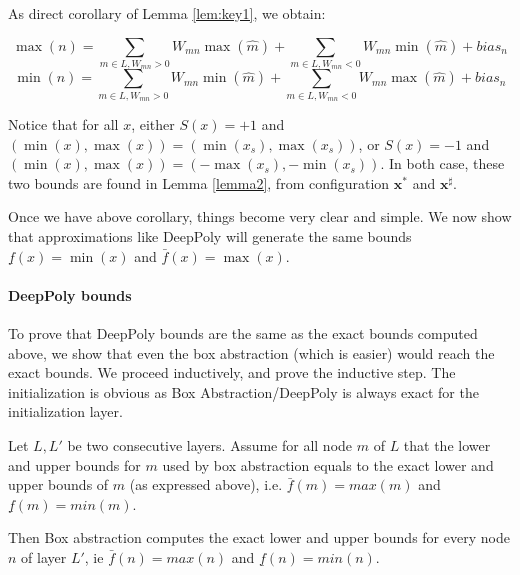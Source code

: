 		As direct corollary of Lemma \ref{lem:key1}, we obtain:
		
		\begin{corollary}
			\label{cor1}
			$$\max(n)=\sum_{m \in L, W_{m n}>0}W_{m n} \max(\hat{m}) + \sum_{m \in L, W_{m n}<0}W_{mn} \min(\hat{m}) + bias_n$$
			$$\min(n)=\sum_{m \in L, W_{m n}>0}W_{m n} \min(\hat{m}) + \sum_{m \in L, W_{m n}<0}W_{mn} \max(\hat{m}) + bias_n$$
		\end{corollary}
		
		
		Notice that for all $x$, either $S(x)=+1$ and 
		$(\min(x),\max(x))=(\min(x_s),\max(x_s))$, 
		or $S(x)=-1$ and $(\min(x),\max(x))=(-\max(x_s),-\min(x_s))$.
		In both case, these two bounds are found in Lemma \ref{lemma2},
		from configuration $\boldsymbol{x}^*$ and $\boldsymbol{x}^\sharp$.
		
		
		
		Once we have above corollary, things become very clear and simple. We now show that approximations like DeepPoly will generate the same bounds 
		$\underline{f}(x)=\min(x)$ and $\bar{f}(x)=\max(x)$.
		
		\paragraph{DeepPoly bounds}
		
		To prove that DeepPoly bounds are the same as the exact bounds computed above, 
		we show that even the box abstraction (which is easier) would reach the exact bounds.
		We proceed inductively, and prove the inductive step.
		The initialization is obvious as Box Abstraction/DeepPoly is always exact for the initialization layer.
		
		\begin{lemma}
			Let $L,L'$ be two consecutive layers.
			Assume for all node $m$ of $L$ that the lower and upper bounds for $m$ used by box abstraction equals to the exact lower and upper bounds of $m$ (as expressed above), i.e.
			$\bar{f}(m)=max(m)$ and $\underline{f}(m)=min(m)$.
			
			Then Box abstraction computes the exact lower and upper bounds for every node $n$ of layer $L'$, ie $\bar{f}(n)=max(n)$ and $\underline{f}(n)=min(n)$.
		\end{lemma}
		
